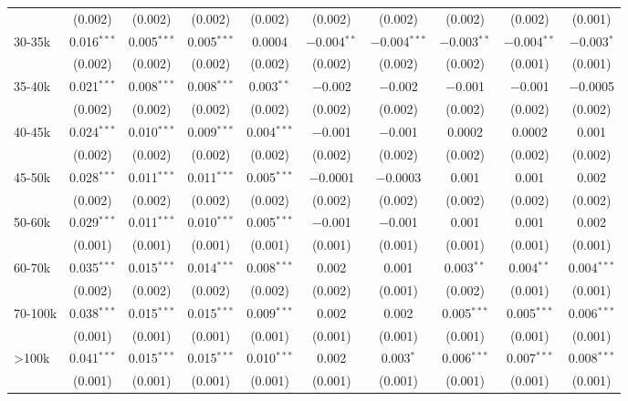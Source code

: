 \begin{table}[!htbp]
\begin{tabular}{@{\extracolsep{5pt}}lccccccccc}
  & (0.002) & (0.002) & (0.002) & (0.002) & (0.002) & (0.002) & (0.002) & (0.002) & (0.001) \\ 
  30-35k & 0.016$^{***}$ & 0.005$^{***}$ & 0.005$^{***}$ & 0.0004 & $-$0.004$^{**}$ & $-$0.004$^{***}$ & $-$0.003$^{**}$ & $-$0.004$^{**}$ & $-$0.003$^{*}$ \\ 
  & (0.002) & (0.002) & (0.002) & (0.002) & (0.002) & (0.002) & (0.002) & (0.001) & (0.001) \\ 
  35-40k & 0.021$^{***}$ & 0.008$^{***}$ & 0.008$^{***}$ & 0.003$^{**}$ & $-$0.002 & $-$0.002 & $-$0.001 & $-$0.001 & $-$0.0005 \\ 
  & (0.002) & (0.002) & (0.002) & (0.002) & (0.002) & (0.002) & (0.002) & (0.002) & (0.002) \\ 
  40-45k & 0.024$^{***}$ & 0.010$^{***}$ & 0.009$^{***}$ & 0.004$^{***}$ & $-$0.001 & $-$0.001 & 0.0002 & 0.0002 & 0.001 \\ 
  & (0.002) & (0.002) & (0.002) & (0.002) & (0.002) & (0.002) & (0.002) & (0.002) & (0.002) \\ 
  45-50k & 0.028$^{***}$ & 0.011$^{***}$ & 0.011$^{***}$ & 0.005$^{***}$ & $-$0.0001 & $-$0.0003 & 0.001 & 0.001 & 0.002 \\ 
  & (0.002) & (0.002) & (0.002) & (0.002) & (0.002) & (0.002) & (0.002) & (0.002) & (0.002) \\ 
  50-60k & 0.029$^{***}$ & 0.011$^{***}$ & 0.010$^{***}$ & 0.005$^{***}$ & $-$0.001 & $-$0.001 & 0.001 & 0.001 & 0.002 \\ 
  & (0.001) & (0.001) & (0.001) & (0.001) & (0.001) & (0.001) & (0.001) & (0.001) & (0.001) \\ 
  60-70k & 0.035$^{***}$ & 0.015$^{***}$ & 0.014$^{***}$ & 0.008$^{***}$ & 0.002 & 0.001 & 0.003$^{**}$ & 0.004$^{**}$ & 0.004$^{***}$ \\ 
  & (0.002) & (0.002) & (0.002) & (0.002) & (0.002) & (0.001) & (0.002) & (0.001) & (0.001) \\ 
  70-100k & 0.038$^{***}$ & 0.015$^{***}$ & 0.015$^{***}$ & 0.009$^{***}$ & 0.002 & 0.002 & 0.005$^{***}$ & 0.005$^{***}$ & 0.006$^{***}$ \\ 
  & (0.001) & (0.001) & (0.001) & (0.001) & (0.001) & (0.001) & (0.001) & (0.001) & (0.001) \\ 
  >100k & 0.041$^{***}$ & 0.015$^{***}$ & 0.015$^{***}$ & 0.010$^{***}$ & 0.002 & 0.003$^{*}$ & 0.006$^{***}$ & 0.007$^{***}$ & 0.008$^{***}$ \\ 
  & (0.001) & (0.001) & (0.001) & (0.001) & (0.001) & (0.001) & (0.001) & (0.001) & (0.001) \\ 

\end{tabular}
\end{table}
